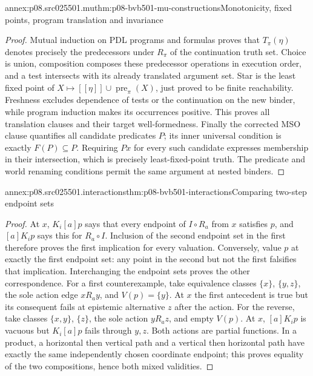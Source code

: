 \begin{annexitem}{annex:p08.src025501.mu}{thm:p08-bvb501-mu-constructions}{Monotonicity, fixed points, program translation and invariance}
\begin{proof}
Mutual induction on PDL programs and formulas proves that
\(T_\pi(\eta)\) denotes precisely the predecessors under \(R_\pi\)
of the continuation truth set. Choice is union, composition composes
these predecessor operations in execution order, and a test intersects
with its already translated argument set. Star is the least fixed
point of \(X\mapsto[\![\eta]\!]\cup\operatorname{pre}_\pi(X)\),
just proved to be finite reachability. Freshness excludes dependence
of tests or the continuation on the new binder, while program induction
makes its occurrences positive. This proves all translation clauses
and their target well-formedness. Finally the corrected MSO clause
quantifies all candidate predicates \(P\); its inner universal
condition is exactly \(F(P)\subseteq P\). Requiring \(Px\)
for every such candidate expresses membership in their intersection,
which is precisely least-fixed-point truth. The predicate and world
renaming conditions permit the same argument at nested binders.
\end{proof}
\end{annexitem}

\begin{annexitem}{annex:p08.src025501.interactions}{thm:p08-bvb501-interactions}{Comparing two-step endpoint sets}
\begin{proof}
At \(x\), \(K_i[a]p\) says that every endpoint of
\(I\circ R_a\) from \(x\) satisfies \(p\), and
\([a]K_ip\) says this for \(R_a\circ I\). Inclusion of
the second endpoint set in the first therefore proves the first
implication for every valuation. Conversely, value \(p\) at
exactly the first endpoint set: any point in the second but not the
first falsifies that implication. Interchanging the endpoint sets
proves the other correspondence.
For a first counterexample, take equivalence classes \(\{x\}\),
\(\{y,z\}\), the sole action edge \(xR_ay\), and
\(V(p)=\{y\}\). At \(x\) the first antecedent is true
but its consequent fails at epistemic alternative \(z\) after
the action. For the reverse, take classes \(\{x,y\}\),
\(\{z\}\), the sole action \(yR_az\), and empty \(V(p)\).
At \(x\), \([a]K_ip\) is vacuous but \(K_i[a]p\)
fails through \(y,z\). Both actions are partial functions.
In a product, a horizontal then vertical path and a vertical then
horizontal path have exactly the same independently chosen coordinate
endpoint; this proves equality of the two compositions, hence both
mixed validities.
\end{proof}
\end{annexitem}

